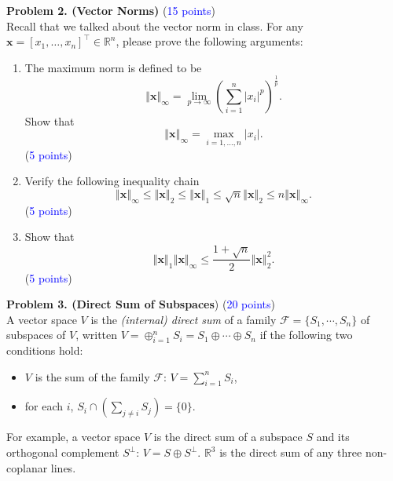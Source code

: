 \documentclass[english,onecolumn]{IEEEtran}
\begin{document}
\noindent \textbf{Problem 2. (Vector Norms)} (\textcolor{blue}{15 points}) \\ Recall that we talked
about the vector norm in class. For any $\mathbf{x}=\left[x_{1},\dots,x_{n}\right]^{\top}\in\mathbb{R}^{n}$,
please prove the following arguments:
\begin{enumerate}
\item The maximum norm is defined to be 
\[
\left\Vert \mathbf{x}\right\Vert _{\infty}=\lim_{p\rightarrow\infty}\left(\sum_{i=1}^{n}\left\vert x_{i}\right\vert ^{p}\right)^{\frac{1}{p}}.
\]
Show that
\[
\left\Vert \mathbf{x}\right\Vert _{\infty}=\max_{i=1,\dots,n}\left\vert x_{i}\right\vert .
\] (\textcolor{blue}{5 points})
\item Verify the following inequality chain
\[
\left\Vert \mathbf{x}\right\Vert _{\infty}\le\left\Vert \mathbf{x}\right\Vert _{2}\le\left\Vert \mathbf{x}\right\Vert _{1}\le\sqrt{n}\left\Vert \mathbf{x}\right\Vert _{2}\le n\left\Vert \mathbf{x}\right\Vert _{\infty}.
\] (\textcolor{blue}{5 points})
\item Show that
\[
\left\Vert \mathbf{x}\right\Vert _{1}\left\Vert \mathbf{x}\right\Vert _{\infty}\le\frac{1+\sqrt{n}}{2}\left\Vert \mathbf{x}\right\Vert _{2}^{2}.
\] (\textcolor{blue}{5 points})
\end{enumerate}

\newpage
\noindent\textbf{Problem 3. (Direct Sum of Subspaces}) (\textcolor{blue}{20 points}) \\
A vector space $V$ is the \emph{(internal) direct sum} of a family $\mathcal{F}=\{S_1, \cdots, S_n\}$ of subspaces of $V$, written $V=\oplus_{i=1}^n{S_i} = S_1\oplus \cdots\oplus S_n$ if the following two conditions hold: 
\begin{itemize}
    \item $V$ is the sum of the family $\mathcal{F}$: $V = \sum_{i=1}^{n}S_i$,
    \item for each $i$, $S_i\cap\left( \sum_{j\neq i}S_j \right) = \{0\}$.
\end{itemize}
For example, a vector space $V$ is the direct sum of a subspace $S$ and its orthogonal complement $S^{\perp}$: $V=S\oplus S^\perp$. $\mathbb{R}^3$ is the direct sum of any three non-coplanar lines. 
\end{document}

